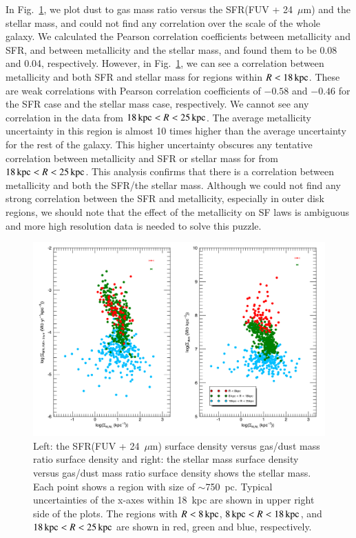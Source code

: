 In Fig.~\ref{fig:metal}, we plot dust to gas mass ratio versus the SFR(FUV + 24~$\mu$m) and the stellar mass, and could not find any correlation over the scale of the whole galaxy.
We calculated the Pearson correlation coefficients between metallicity and SFR, and between metallicity and the stellar mass, and found them to be 0.08 and 0.04, respectively. 
However, in Fig.~\ref{fig:metal}, we can see a correlation between metallicity and both SFR and stellar mass for regions within $R< 18\,{\rm kpc}$. These are weak correlations with Pearson correlation coefficients of $-0.58$ and $-0.46$ for the SFR case and the stellar mass case, respectively.
We cannot see any correlation in the data from $18\,{\rm kpc} < R < 25\,{\rm kpc}$. The average metallicity uncertainty in this region is almost 10 times higher than the average uncertainty for the rest of the galaxy. This higher uncertainty obscures any tentative correlation between metallicity and SFR or stellar mass for from $18\,{\rm kpc} < R < 25\,{\rm kpc}$.   
This analysis confirms that there is a correlation between metallicity and both the SFR/the stellar mass. Although we could not find any strong correlation between the SFR and metallicity, especially in outer disk regions, we should note that the effect of the metallicity on SF laws is ambiguous and more high resolution data is needed to solve this puzzle.

\begin{figure}
\centering
\includegraphics[width=\textwidth]{../image_paper1/metal_with_errors.png}
    \caption[The SFR(FUV + 24~$\mu$m) surface density and the stellar mass surface density versus gas/dust mass ratio]{Left: the SFR(FUV + 24~$\mu$m) surface density versus gas/dust mass ratio surface density and right: the stellar mass surface density versus gas/dust mass ratio surface density  shows the stellar mass. Each point shows a region with size of $\sim$750~pc. Typical uncertainties of the x-axes within 18~kpc are shown in upper right side of the plots. The regions with $R< 8\,{\rm kpc}$, $8\,{\rm kpc} < R < 18\,{\rm kpc}$, and $18\,{\rm kpc} < R < 25\,{\rm kpc}$ are shown in red, green and blue, respectively.}
    \label{fig:metal}
\end{figure}

